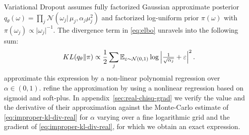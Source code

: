 \documentclass[a4paper,10pt,onecolumn]{article}
\begin{document}
%
Variational Dropout assumes fully factorized Gaussian approximate posterior $
  q_\theta(\omega)
    = \prod_j \mathcal{N}(\omega_j \vert\, \mu_j, \alpha_j \mu_j^2)
$ and factorized log-uniform prior $\pi(\omega)$ with $
  \pi(\omega_j) \propto \lvert \omega_j \rvert^{-1}
$. The divergence term in \eqref{eq:elbo} unravels into the following sum:
\begin{equation}  \label{eq:improper-kl-div-real}
  KL(q_\theta \| \pi)
    \propto
      \frac12 \sum_j \mathbb{E}_{\varepsilon \sim \mathcal{N}(0, 1)}
        \log{\Bigl\lvert \tfrac1{\sqrt{\alpha_j}} + \varepsilon \Bigr\rvert^2}
  \,.
\end{equation}
\citet{kingma_variational_2015} approximate this expression by a non-linear polynomial
regression over $\alpha \in (0, 1)$. \citet{molchanov_variational_2017} refine the
approximation by using a nonlinear regression based on sigmoid and soft-plus.
In appendix~\ref{sec:real-chisq-grad} we verify the value and the derivative of their
approximation against the Monte-Carlo estimate of \eqref{eq:improper-kl-div-real} for $\alpha$
varying over a fine logarithmic grid and the gradient of \eqref{eq:improper-kl-div-real},
for which we obtain an exact expression.
\end{document}

